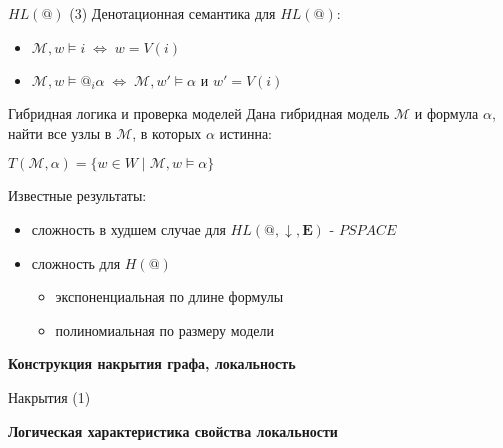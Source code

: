 \documentclass{beamer}
\begin{document}
\begin{frame}{$HL(@)$ (3)}
Денотационная семантика для $HL(@)$:\\
\bigskip
\begin{itemize}
	\item $\mathcal{M}, w \models i \; \Leftrightarrow \; w = V(i)$
	\item $\mathcal{M}, w \models @_i \alpha \; \Leftrightarrow \; \mathcal{M}, w' \models \alpha$ и $w' = V(i)$
\end{itemize}
\end{frame}


\begin{frame}{Гибридная логика и проверка моделей}
Дана гибридная модель $\mathcal{M}$ и формула $\alpha$, найти все узлы в $\mathcal{M}$, в которых $\alpha$ истинна:
\bigskip
\begin{center}
    $T(\mathcal{M}, \alpha) = \{ w \in W \; | \; \mathcal{M}, w \models \alpha \}$
\end{center}
\bigskip
Известные результаты:\\  %
\bigskip
\begin{itemize}
	\item сложность в худшем случае для $HL(@, \downarrow, \textbf{E})$ - $PSPACE$
	\item сложность для $H(@)$ 
		\begin{itemize}
			\item экспоненциальная по длине формулы
			\item полиномиальная по размеру модели
		\end{itemize}
\end{itemize}
\end{frame}



\begin{frame}{}
\begin{center}
	\textbf{Конструкция накрытия графа, локальность}
\end{center}
\end{frame}

\begin{frame}{Накрытия (1)}
\end{frame}



\begin{frame}{}
\begin{center}
	\textbf{Логическая характеристика свойства локальности}
\end{center}
\end{frame}
\end{document}
